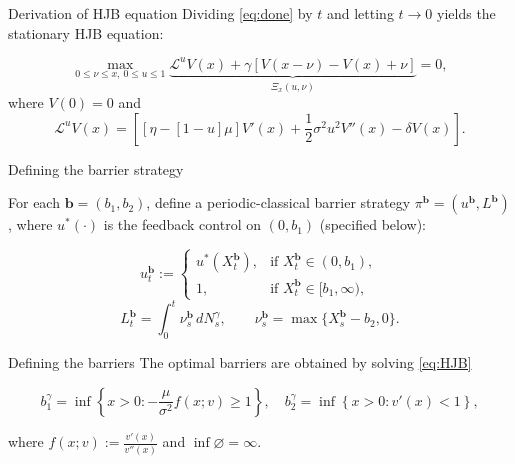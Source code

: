 \documentclass{beamer}
\theoremstyle{definition}
\begin{document}
\begin{frame}{Derivation of HJB equation}
Dividing \eqref{eq:done} by \(t\) and letting \(t \to 0\) yields the stationary HJB equation:

\begin{equation}
    \max_{0 \leq \nu \leq x, \ 0 \leq u \leq 1} \underbrace{\mathcal{L}^u V(x) + \gamma \left[V(x - \nu) - V(x) + \nu  \right]}_{\Xi_{x}(u,\nu)} = 0,
    \label{eq:HJB}
\end{equation}
where \(V(0) = 0\) and
\begin{equation*}
    \mathcal{L}^u V(x) = \left[[\eta - [1-u]\mu]V'(x)+ \frac{1}{2}\sigma^2 u^2 V''(x)- \delta V(x)\right].
\end{equation*}

    
\end{frame}

\begin{frame}{Defining the barrier strategy}

For each \( \mathbf{b} = (b_1, b_2)\), define a periodic-classical barrier strategy \(\pi^{\mathbf{b}} = (u^{\mathbf{b}}, L^{\mathbf{b}})\), where \(u^{*}(\cdot)\) is the feedback control on \((0,b_1)\) (specified below):

\begin{equation}
    u_t^{\mathbf{b}} := 
    \begin{cases}
        u^{*}(X_t^{\mathbf{b}}), & \text{if } X_t^{\mathbf{b}} \in (0,b_1), \\
        1, & \text{if } X_t^{\mathbf{b}} \in [b_1,\infty),
    \end{cases}
    \label{eq:barrier_strat}
\end{equation}
\[
L_t^{\mathbf{b}} = \int_{0}^{t} \nu_s^{\mathbf{b}} \, dN_s^\gamma,
\qquad
\nu_s^{\mathbf{b}} = \max\{ X_s^{\mathbf{b}} - b_2, 0 \}.
\]

\end{frame}

\begin{frame}{Defining the barriers}
    The optimal barriers are obtained by solving \eqref{eq:HJB}

    \begin{equation}
    b_1^{\gamma} = \inf \left\{ x > 0 : -\frac{\mu}{\sigma^2} f(x;v) \geq 1 \right\}, \quad
    b_2^{\gamma} = \inf \left\{ x > 0 : v'(x) < 1 \right\},
    \label{eq:optim_bar}
\end{equation}


where \(f(x; v) := \frac{v'(x)}{v''(x)}\) and \(\inf \varnothing = \infty\).

\end{frame}
\end{document}
